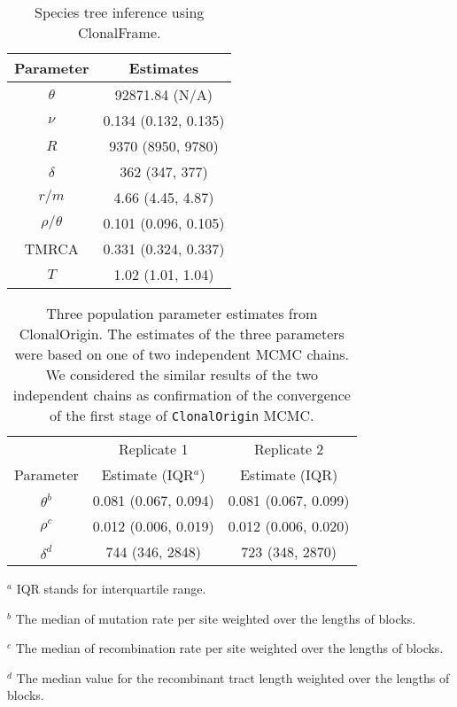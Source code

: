 \documentclass[english]{article}
\providecommand{\tabularnewline}{\\}
\begin{document}
\begin{table}
\caption{\label{tab:clonalframe}Species tree inference using ClonalFrame.}
\noindent \centering{}\begin{tabular}{cc}
Parameter & Estimates\tabularnewline
\hline
$\theta$ & 92871.84 (N/A)\tabularnewline
$\nu$ & 0.134 (0.132, 0.135)\tabularnewline
$R$ & 9370 (8950, 9780)\tabularnewline
$\delta$ & 362 (347, 377)\tabularnewline
$r/m$ & 4.66 (4.45, 4.87)\tabularnewline
$\rho/\theta$ & 0.101 (0.096, 0.105)\tabularnewline
TMRCA & 0.331 (0.324, 0.337)\tabularnewline
$T$ & 1.02 (1.01, 1.04)\tabularnewline
\hline
\end{tabular}
\end{table}
\clearpage{}

\begin{table}
\caption{\label{tab:three}Three population parameter estimates from
ClonalOrigin. 
The estimates of the three parameters were based on one of two independent
MCMC chains.  We considered the similar 
results of the two independent chains as confirmation of 
the convergence of the first stage of \texttt{ClonalOrigin} MCMC.
}
\noindent \centering{}\begin{tabular}{ccc}
& Replicate 1 & Replicate 2\tabularnewline
Parameter & Estimate (IQR$^a$) & Estimate (IQR)\tabularnewline
\hline
$\theta^b$ & 0.081 (0.067, 0.094) & 0.081 (0.067, 0.099)\tabularnewline
$\rho^c$ & 0.012 (0.006, 0.019) & 0.012 (0.006, 0.020)\tabularnewline
$\delta^d$ & 744 (346, 2848) & 723 (348, 2870)\tabularnewline
\hline
\end{tabular}

$^a$ IQR stands for interquartile range.

$^b$ The median of mutation rate per site weighted over the lengths of blocks. 

$^c$ The median of recombination rate per site weighted over the lengths of blocks.

$^d$ The median value for the recombinant tract length weighted over the lengths of blocks.

\end{table}
\clearpage{}
\end{document}
